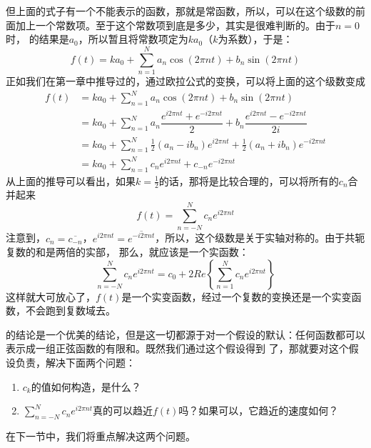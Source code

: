        但上面的式子有一个不能表示的函数，那就是常函数，所以，可以在这个级数的前面加上一个常数项。至于这个常数项到底是多少，其实是很难判断的。由于$n = 0$时，%
        的结果是$a_0$，所以暂且将常数项定为$ka_0$（$k$为系数），于是：
        \begin{equation}
            f(t) = ka_0 + \sum_{n = 1}^{N} a_n\cos(2\pi nt) + b_n\sin(2\pi nt)
            \label{eq: 3.2}
        \end{equation}
        正如我们在第一章中推导过的，通过欧拉公式的变换，可以将上面的这个级数变成
        \begin{equation*}
            \begin{split}
                f(t) &= ka_0 + \sum_{n = 1}^{N} a_n\cos(2\pi nt) + b_n\sin(2\pi nt)\\
                &= ka_0 + \sum_{n = 1}^{N} a_n\dfrac{e^{i2\pi nt} + e^{-i2\pi nt}}{2} + b_n\dfrac{e^{i2\pi nt} - e^{-i2\pi nt}}{2i}\\
                &= ka_0 + \sum_{n = 1}^{N} \frac 1 2 (a_n - ib_n)e^{i2\pi nt} + \frac 1 2 (a_n + ib_n) e^{-i2\pi nt}\\
                &= ka_0 + \sum_{n = 1}^{N} c_n e^{i2\pi nt} + c_{-n} e^{-i2\pi nt}
            \end{split}
        \end{equation*}
        从上面的推导可以看出，如果$k = \frac 1 2$的话，那将是比较合理的，可以将所有的$c_n$合并起来
        \begin{equation}
            f(t) = \sum_{n = -N}^{N} c_n e^{i2\pi nt}
            \label{eq: 3.3}
        \end{equation}
        注意到，$c_n = \overline{c_{-n}}$，$e^{i2\pi nt} = \overline{e^{-i2\pi nt}}$，所以，这个级数是关于实轴对称的。由于共轭复数的和是两倍的实部，%
        那么，就应该是一个实函数：
        \begin{equation*}
            \sum_{n = -N}^{N} c_n e^{i2\pi nt} = c_0 + 2Re\left\{\sum_{n = 1}^{N} c_n e^{i2\pi nt}\right\}
        \end{equation*}
        这样就大可放心了，$f(t)$是一个实变函数，经过一个复数的变换还是一个实变函数，不会跑到复数域去。

        的结论是一个优美的结论，但是这一切都源于对一个假设的默认：任何函数都可以表示成一组正弦函数的有限和。既然我们通过这个假设得到%
        了，那就要对这个假设负责，解决下面两个问题：

        \begin{enumerate}
            \item $c_k$的值如何构造，是什么？
            \item $\sum\limits_{n = -N}^{N} c_n e^{i2\pi nt}$真的可以趋近$f(t)$吗？如果可以，它趋近的速度如何？
        \end{enumerate}
        在下一节中，我们将重点解决这两个问题。